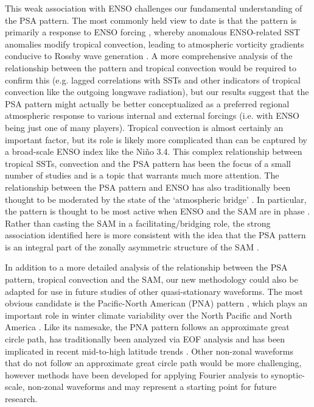 This weak association with ENSO challenges our fundamental understanding of the PSA pattern. The most commonly held view to date is that the pattern is primarily a response to ENSO forcing \citep[e.g.][]{Mo2001}, whereby anomalous ENSO-related SST anomalies modify tropical convection, leading to atmospheric vorticity gradients conducive to Rossby wave generation \citep{Sardeshmukh1988}. A more comprehensive analysis of the relationship between the pattern and tropical convection would be required to confirm this (e.g. lagged correlations with SSTs and other indicators of tropical convection like the outgoing longwave radiation), but our results suggest that the PSA pattern might actually be better conceptualized as a preferred regional atmospheric response to various internal and external forcings (i.e. with ENSO being just one of many players). Tropical convection is almost certainly an important factor, but its role is likely more complicated than can be captured by a broad-scale ENSO index like the Ni\~{n}o 3.4. This complex relationship between tropical SSTs, convection and the PSA pattern has been the focus of a small number of studies \citep[e.g.][]{Harangozo2004,LachlanCope2006} and is a topic that warrants much more attention. The relationship between the PSA pattern and ENSO has also traditionally been thought to be moderated by the state of the `atmospheric bridge' \citep{Liu2007}. In particular, the pattern is thought to be most active when ENSO and the SAM are in phase \citep{Fogt2006}. Rather than casting the SAM in a facilitating/bridging role, the strong association identified here is more consistent with the idea that the PSA pattern is an integral part of the zonally asymmetric structure of the SAM \citep[e.g.][]{Ding2012,Fogt2012}. 

In addition to a more detailed analysis of the relationship between the PSA pattern, tropical convection and the SAM, our new methodology could also be adapted for use in future studies of other quasi-stationary waveforms. The most obvious candidate is the Pacific-North American (PNA) pattern \citep{Wallace1981}, which plays an important role in winter climate variability over the North Pacific and North America \citep[e.g.][]{Notaro2006}. Like its namesake, the PNA pattern follows an approximate great circle path, has traditionally been analyzed via EOF analysis and has been implicated in recent mid-to-high latitude trends \citep[e.g.][]{Ding2014,Liu2015}. Other non-zonal waveforms that do not follow an approximate great circle path would be more challenging, however methods have been developed for applying Fourier analysis to synoptic-scale, non-zonal waveforms \citep{Zimin2006,Souders2014} and may represent a starting point for future research. 
